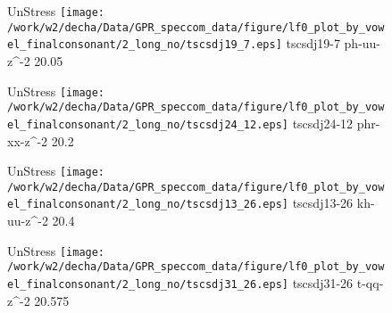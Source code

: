 \documentclass{article}
\begin{document}
\begin{figure}[t]
\begin{minipage}[b]{.24\textwidth}
UnStress
\centering
\texttt{[image: /work/w2/decha/Data/GPR\_speccom\_data/figure/lf0\_plot\_by\_vowel\_finalconsonant/2\_long\_no/tscsdj19\_7.eps]}
tscsdj19-7 ph-uu-z\textasciicircum-2 20.05
\end{minipage}
\begin{minipage}[b]{.24\textwidth}
UnStress
\centering
\texttt{[image: /work/w2/decha/Data/GPR\_speccom\_data/figure/lf0\_plot\_by\_vowel\_finalconsonant/2\_long\_no/tscsdj24\_12.eps]}
tscsdj24-12 phr-xx-z\textasciicircum-2 20.2
\end{minipage}
\begin{minipage}[b]{.24\textwidth}
UnStress
\centering
\texttt{[image: /work/w2/decha/Data/GPR\_speccom\_data/figure/lf0\_plot\_by\_vowel\_finalconsonant/2\_long\_no/tscsdj13\_26.eps]}
tscsdj13-26 kh-uu-z\textasciicircum-2 20.4
\end{minipage}
\begin{minipage}[b]{.24\textwidth}
UnStress
\centering
\texttt{[image: /work/w2/decha/Data/GPR\_speccom\_data/figure/lf0\_plot\_by\_vowel\_finalconsonant/2\_long\_no/tscsdj31\_26.eps]}
tscsdj31-26 t-qq-z\textasciicircum-2 20.575
\end{minipage}
\end{figure}
\end{document}
